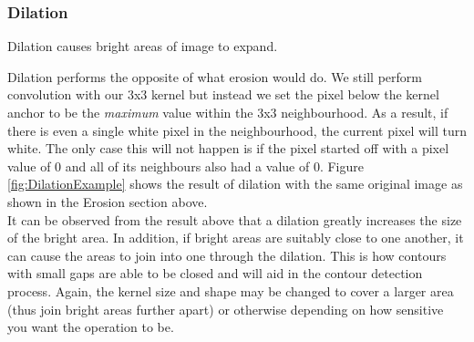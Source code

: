 \documentclass[11pt]{article}
\begin{document}
\subsubsection{Dilation}
\begin{center}
	Dilation causes bright areas of image to expand.
\end{center}

Dilation performs the opposite of what erosion would do. We still perform 
convolution with our 3x3 kernel but instead we set the pixel below the
kernel anchor to be the \textit{maximum} value within the 3x3 neighbourhood.
As a result, if there is even a single white pixel in the neighbourhood, the
current pixel will turn white. The only case this will not happen is if the 
pixel started off with a pixel value of 0 and all of its neighbours also had
a value of 0. Figure \ref{fig:DilationExample} shows the result of dilation with
the same original image as shown in the Erosion section above. 
\\
It can be observed from the result above that a dilation greatly increases
the size of the bright area. In addition, if bright areas are suitably close
to one another, it can cause the areas to join into one through the dilation.
This is how contours with small gaps are able to be closed and will aid in the
contour detection process. Again, the kernel size and shape may be changed to
cover a larger area (thus join bright areas further apart) or otherwise 
depending on how sensitive you want the operation to be.
\end{document}
